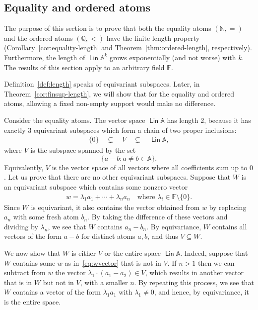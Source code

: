 \documentclass{theoretics}
\newcommand{\Nat}{{\mathbb N}}
\newcommand{\Rat}{{\mathbb Q}}
\newcommand{\set}[1]{\{#1\}}
\newcommand{\atoms}{\mathbb A}
\DeclareMathOperator{\lin}{\mathsf{Lin}}
\newcommand{\field}{\mathbb F}
\begin{document}
\subsection{Equality and ordered atoms}

The purpose of this section is to prove that both the equality atoms $(\Nat,=)$ and the ordered atoms $(\Rat, <)$ have the finite length property (Corollary~\ref{cor:equality-length} and Theorem~\ref{thm:ordered-length}, respectively). 
 Furthermore, the length of $\lin \atoms^k$ grows exponentially (and not worse) with $k$. The results of this section apply to an arbitrary field $\field$. 

 Definition~\ref{def:length} speaks of equivariant subspaces. Later, in Theorem~\ref{cor:finsup-length}, we will show that  for the equality and ordered atoms,   allowing a fixed non-empty support would make no difference.

\begin{example}\label{ex:moerman-space}
	Consider the equality atoms. The vector space $\lin \atoms$ has length 2, because it has exactly 3 equivariant subspaces which form a chain of two proper inclusions:
	\begin{align*}
	\set{0} \quad \subsetneq \quad V \quad \subsetneq \quad \lin \atoms,
	\end{align*}
	where $V$ is the subspace spanned by the set
	\[\set{a-b : a \neq b \in \atoms}.\]
	Equivalently, $V$ is the vector space of all vectors where all coefficients sum up to $0$.
	Let us prove that there are no other equivariant subspaces. Suppose that $W$ is an equivariant subspace which contains some nonzero vector 
	\begin{align}\label{eq:wvector}
	w = \lambda_1 a_1 + \cdots + \lambda_n a_n \quad \text{where $\lambda_i \in \field\setminus\set{0}$.}
	\end{align}
	Since $W$ is equivariant, it also contains the vector obtained from $w$ by replacing $a_n$ with some fresh atom $b_n$. By taking the difference of these vectors and dividing by $\lambda_n$, we see that $W$ contains  $a_n - b_n$. By equivariance, $W$ contains all vectors of the form $a - b$ for distinct atoms $a,b$, and thus $V \subseteq W$.

We now show that $W$ is either $V$ or the entire space $\lin \atoms$. Indeed, suppose that $W$ contains some $w$ as in~\eqref{eq:wvector} that is not in $V$.
		If $n > 1$ then we can subtract from $w$ the  vector $\lambda_1 \cdot (a_1  - a_2)\in V$, which results in another vector that is in $W$ but not in $V$, with a smaller $n$. By repeating this process, we see that $W$ contains a vector of the form $\lambda_1 a_1$ with $\lambda_1 \neq 0$, and hence, by equivariance, it is the entire space.
\end{example}
\end{document}
